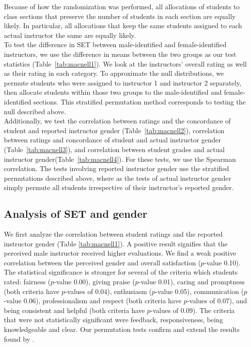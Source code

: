 \documentclass[12pt]{article}
\begin{document}
Because of how the randomization was performed, all allocations of students to class sections that preserve the number of students in each section are equally likely.  In particular, all allocations that keep the same students assigned to each actual instructor the same are equally likely.  \\

To test the difference in SET between male-identified and female-identified instructors, we use the difference in means between the two groups as our test statistics (Table~\ref{tab:macnell1}).  We look at the instructors' overall rating as well as their rating in each category.  To approximate the null distributions, we permute students who were assigned to instructor 1 and instructor 2 separately, then allocate students within those two groups to the male-identified and female-identified sections.  This stratified permutation method corresponds to testing the null described above. \\

Additionally, we test the correlation between ratings and the concordance of student and reported instructor gender (Table~\ref{tab:macnell2}), correlation between ratings and concordance of student and actual instructor gender (Table~\ref{tab:macnell3}), and correlation between student grades and actual instructor gender(Table~\ref{tab:macnell4}).  For these tests, we use the Spearman correlation.  The tests involving reported instructor gender use the stratified permutations described above, where as the tests of actual instructor gender simply permute all students irrespective of their instructor's reported gender.

\subsection{Analysis of SET and gender}
We first analyze the correlation between student ratings and the reported instructor gender (Table \ref{tab:macnell1}). A positive result signifies that the perceived male instructor received higher evaluations. We find a weak positive correlation between the perceived gender and overall satisfaction ($p$-value 0.10). The statistical significance is stronger for several of the criteria which students rated: fairness ($p$-value 0.00), giving praise ($p$-value 0.01), caring and promptness (both criteria have $p$-values of 0.04), enthusiasm ($p$-value 0.05), communication ($p$-value 0.06), professionalism and respect (both criteria have $p$-values of 0.07), and being consistent and helpful (both criteria have $p$-values of 0.09). The criteria that were not statistically significant were feedback, responsiveness, being knowledgeable and clear. Our permutation tests confirm and extend the results found by \citet{MacNell2014}.
\end{document}
